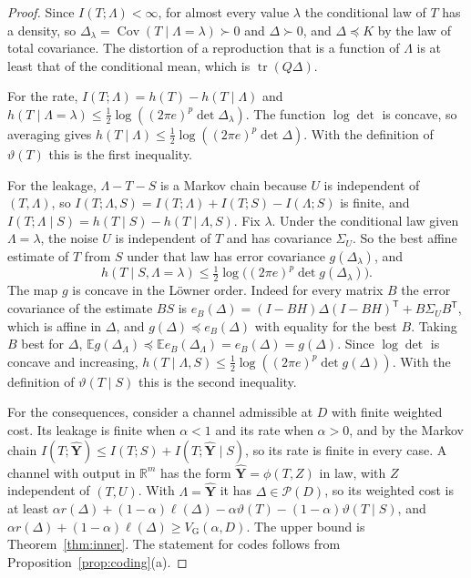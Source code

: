 \documentclass[11pt,onecolumn]{IEEEtran}
\newcommand{\E}{\mathbb{E}}
\newcommand{\R}{\mathbb{R}}
\newcommand{\tr}{\operatorname{tr}}
\newcommand{\Cov}{\operatorname{Cov}}
\newcommand{\hY}{\hat{\mathbf Y}}
\newcommand{\VG}{V_{\mathrm G}}
\begin{document}
\begin{proof}
Since $I(T;\Lambda)<\infty$, for almost every value $\lambda$ the
conditional law of $T$ has a density, so
$\Delta_\lambda=\Cov(T\mid\Lambda=\lambda)\succ0$ and $\Delta\succ0$, and
$\Delta\preceq K$ by the law of total covariance. The distortion of a
reproduction that is a function of $\Lambda$ is at least that of the
conditional mean, which is $\tr(Q\Delta)$.

For the rate, $I(T;\Lambda)=h(T)-h(T\mid\Lambda)$ and
$h(T\mid\Lambda=\lambda)\le\tfrac12\log((2\pi e)^p\det\Delta_\lambda)$. The
function $\log\det$ is concave, so averaging gives
$h(T\mid\Lambda)\le\tfrac12\log((2\pi e)^p\det\Delta)$. With the
definition of $\vartheta(T)$ this is the first inequality.

For the leakage, $\Lambda-T-S$ is a Markov chain because $U$ is
independent of $(T,\Lambda)$, so
$I(T;\Lambda,S)=I(T;\Lambda)+I(T;S)-I(\Lambda;S)$ is finite, and
$I(T;\Lambda\mid S)=h(T\mid S)-h(T\mid\Lambda,S)$. Fix $\lambda$. Under
the conditional law given $\Lambda=\lambda$, the noise $U$ is
independent of $T$ and has covariance $\Sigma_U$. So the best affine
estimate of $T$ from $S$ under that law has error covariance
$g(\Delta_\lambda)$, and
\[
h(T\mid S,\Lambda=\lambda)\le\tfrac12\log\bigl((2\pi e)^p\det g(\Delta_\lambda)\bigr).
\]
The map $g$ is concave in the L\"owner order. Indeed for every matrix
$B$ the error covariance of the estimate $BS$ is
$e_B(\Delta)=(I-BH)\Delta(I-BH)^{\mathsf T}+B\Sigma_UB^{\mathsf T}$, which
is affine in $\Delta$, and $g(\Delta)\preceq e_B(\Delta)$ with equality
for the best $B$. Taking $B$ best for $\Delta$,
$\E g(\Delta_\Lambda)\preceq\E e_B(\Delta_\Lambda)=e_B(\Delta)=g(\Delta)$.
Since $\log\det$ is concave and increasing,
$h(T\mid\Lambda,S)\le\tfrac12\log((2\pi e)^p\det g(\Delta))$. With the
definition of $\vartheta(T\mid S)$ this is the second inequality.

For the consequences, consider a channel admissible at $D$ with finite
weighted cost. Its leakage is finite when $\alpha<1$ and its rate when
$\alpha>0$, and by the Markov chain
$I(T;\hY)\le I(T;S)+I(T;\hY\mid S)$, so its rate is finite in every
case. A channel with output in $\R^m$ has the form $\hY=\phi(T,Z)$ in
law, with $Z$ independent of $(T,U)$. With $\Lambda=\hY$ it has
$\Delta\in\mathcal P(D)$, so its weighted cost is at least
$\alpha r(\Delta)+(1-\alpha)\ell(\Delta)-\alpha\vartheta(T)-(1-\alpha)\vartheta(T\mid S)$,
and $\alpha r(\Delta)+(1-\alpha)\ell(\Delta)\ge\VG(\alpha,D)$. The upper
bound is Theorem~\ref{thm:inner}. The statement for codes follows from
Proposition~\ref{prop:coding}(a).
\end{proof}
\end{document}
